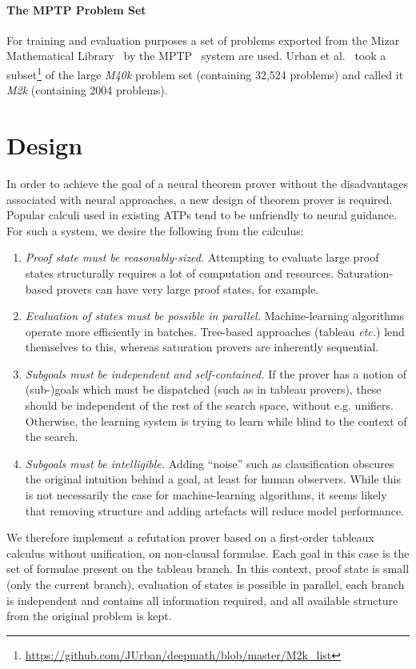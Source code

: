\documentclass{llncs}
\newcommand{\mizarlarge}{\textit{M40k}}
\newcommand{\mizarsmall}{\textit{M2k}}
\begin{document}
\paragraph{The MPTP Problem Set}
For training and evaluation purposes a set of problems exported from the Mizar Mathematical Library~\cite{mizar} by the MPTP~\cite{MPTP} system are used.
Urban et al.~\cite{rlCoP} took a subset\footnote{\url{https://github.com/JUrban/deepmath/blob/master/M2k_list}} of the large \mizarlarge{} problem set (containing 32,524 problems) and called it \mizarsmall{} (containing 2004 problems).

\section{Design}
\label{section:Design}
In order to achieve the goal of a neural theorem prover without the disadvantages associated with neural approaches, a new design of theorem prover is required.
Popular calculi used in existing ATPs tend to be unfriendly to neural guidance.
For such a system, we desire the following from the calculus:
\begin{enumerate}
        \item \emph{Proof state must be reasonably-sized.} Attempting to evaluate large proof states structurally requires a lot of computation and resources. Saturation-based provers can have very large proof states, for example.
        \item \emph{Evaluation of states must be possible in parallel.} Machine-learning algorithms operate more efficiently in batches. Tree-based approaches (tableau \emph{etc.}) lend themselves to this, whereas saturation provers are inherently sequential.
        \item \emph{Subgoals must be independent and self-contained.} If the prover has a notion of (sub-)goals which must be dispatched (such as in tableau provers), these should be independent of the rest of the search space, without e.g. unifiers. 
        Otherwise, the learning system is trying to learn while blind to the context of the search.
	\item \emph{Subgoals must be intelligible.} Adding ``noise'' such as clausification obscures the original intuition behind a goal, at least for human observers. While this is not necessarily the case for machine-learning algorithms, it seems likely that removing structure and adding artefacts will reduce model performance.
\end{enumerate}
We therefore implement a refutation prover based on a first-order tableaux calculus without unification, on non-clausal formulae.
Each goal in this case is the set of formulae present on the tableau branch.
In this context, proof state is small (only the current branch), evaluation of states is possible in parallel, each branch is independent and contains all information required, and all available structure from the original problem is kept.
\end{document}
